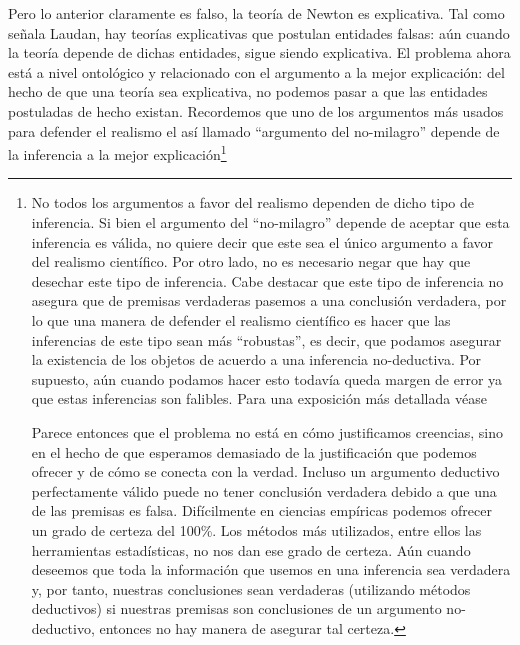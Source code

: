 Pero lo anterior claramente es falso, la teoría de Newton es explicativa. Tal como señala Laudan, hay teorías explicativas que postulan entidades falsas: aún cuando la teoría depende de dichas entidades, sigue siendo explicativa. El problema ahora está a nivel ontológico y relacionado con el argumento a la mejor explicación: del hecho de que una teoría sea explicativa, no podemos pasar a que las entidades postuladas de hecho existan. Recordemos que uno de los argumentos más usados para defender el realismo el así llamado ``argumento del no-milagro'' depende de la inferencia a la mejor explicación\footnote{No todos los argumentos a favor del realismo dependen de dicho tipo de inferencia. Si bien el argumento del ``no-milagro'' depende de aceptar que esta inferencia es válida, no quiere decir que este sea el único argumento a favor del realismo científico. Por otro lado, no es necesario negar que hay que desechar este tipo de inferencia. Cabe destacar que este tipo de inferencia no asegura que de premisas verdaderas pasemos a una conclusión verdadera, por lo que una manera de defender el realismo científico es hacer que las inferencias de este tipo sean más ``robustas'', es decir, que podamos asegurar la existencia de los objetos de acuerdo a una inferencia no-deductiva. Por supuesto, aún cuando podamos hacer esto todavía queda margen de error ya que estas inferencias son falibles. Para una exposición más detallada véase %

Parece entonces que el problema no está en cómo justificamos creencias, sino en el hecho de que esperamos demasiado de la justificación que podemos ofrecer y de cómo se conecta con la verdad. Incluso un argumento deductivo perfectamente válido puede no tener conclusión verdadera debido a que una de las premisas es falsa. Difícilmente en ciencias empíricas podemos ofrecer un grado de certeza del 100\%. Los métodos más utilizados, entre ellos las herramientas estadísticas, no nos dan ese grado de certeza. Aún cuando deseemos que toda la información que usemos en una inferencia sea verdadera y, por tanto, nuestras conclusiones sean verdaderas (utilizando métodos deductivos) si nuestras premisas son conclusiones de un argumento no-deductivo, entonces no hay manera de asegurar tal certeza.


}
